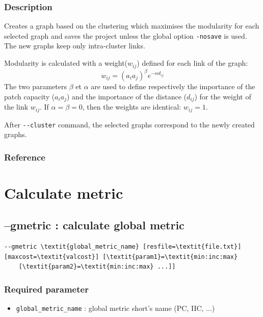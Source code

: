\documentclass[a4paper,10pt]{report}
\begin{document}
\subsubsection{Description}
Creates a graph based on the clustering which maximises the modularity \cite{Newman2006} for each selected graph and saves the project unless the global option \verb|-nosave| is used.
The new graphs keep only intra-cluster links.

Modularity is calculated with a weight($w_{ij}$) defined for each link of the graph:
$$w_{ij} = (a_i a_j)^\beta e^{-\alpha d_{ij}}$$
The two parameters $\beta$ et $\alpha$ are used to define respectively the importance of the patch capacity ($a_i a_j$) and the importance of the distance ($d_{ij}$) for the weight of the link $w_{ij}$. If $\alpha = \beta = 0$, then the weights are identical: $w_{ij} = 1$.  

After \verb|--cluster| command, the selected graphs correspond to the newly created graphs.

\subsubsection{Reference}
\cite{2017_clustering}


\section{Calculate metric}

\subsection{--gmetric : calculate global metric}
\begin{Verbatim}[commandchars=\\\{\}]
--gmetric \textit{global_metric_name} [resfile=\textit{file.txt}] [maxcost=\textit{valcost}] [\textit{param1}=\textit{min:inc:max}
	[\textit{param2}=\textit{min:inc:max} ...]]
\end{Verbatim}

\subsubsection{Required parameter}
\begin{itemize}
	\item \verb|global_metric_name| : global metric short's name (PC, IIC, ...)
\end{itemize}
\end{document}
